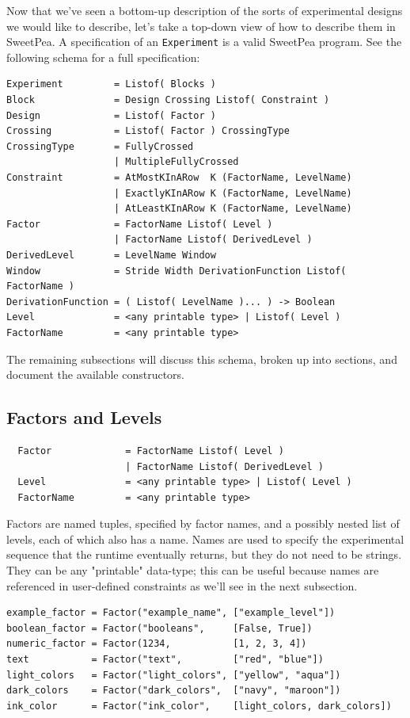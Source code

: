 Now that we've seen a bottom-up description of the sorts of experimental designs we would like to describe, let's take a top-down view of how to describe them in SweetPea. A specification of an \texttt{Experiment} is a valid SweetPea program. See the following schema for a full specification:

\begin{verbatim}
Experiment         = Listof( Blocks )
Block              = Design Crossing Listof( Constraint )
Design             = Listof( Factor )
Crossing           = Listof( Factor ) CrossingType
CrossingType       = FullyCrossed
                   | MultipleFullyCrossed
Constraint         = AtMostKInARow  K (FactorName, LevelName)
                   | ExactlyKInARow K (FactorName, LevelName)
                   | AtLeastKInARow K (FactorName, LevelName)
Factor             = FactorName Listof( Level )
                   | FactorName Listof( DerivedLevel )
DerivedLevel       = LevelName Window
Window             = Stride Width DerivationFunction Listof( FactorName )
DerivationFunction = ( Listof( LevelName )... ) -> Boolean
Level              = <any printable type> | Listof( Level )
FactorName         = <any printable type>
\end{verbatim}

The remaining subsections will discuss this schema, broken up into sections, and document the available constructors.

\subsection{Factors and Levels}

\begin{verbatim}
  Factor             = FactorName Listof( Level )
                     | FactorName Listof( DerivedLevel )
  Level              = <any printable type> | Listof( Level )
  FactorName         = <any printable type>
\end{verbatim}

Factors are named tuples, specified by factor names, and a possibly nested list of levels, each of which also has a name. Names are used to specify the experimental sequence that the runtime eventually returns, but they do not need to be strings. They can be any "printable" data-type; this can be useful because names are referenced in user-defined constraints as we'll see in the next subsection.

\begin{verbatim}
example_factor = Factor("example_name", ["example_level"])
boolean_factor = Factor("booleans",     [False, True])
numeric_factor = Factor(1234,           [1, 2, 3, 4])
text           = Factor("text",         ["red", "blue"])
light_colors   = Factor("light_colors", ["yellow", "aqua"])
dark_colors    = Factor("dark_colors",  ["navy", "maroon"])
ink_color      = Factor("ink_color",    [light_colors, dark_colors])
\end{verbatim}

